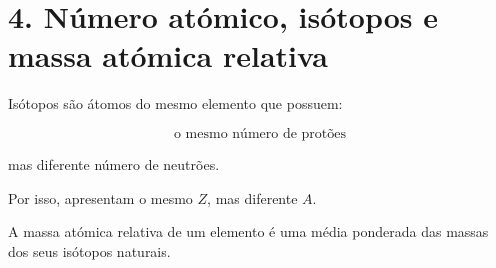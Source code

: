 \documentclass[11pt,a4paper]{article}
\begin{document}
	
	\section*{\textcolor{eublue}{4. Número atómico, isótopos e massa atómica relativa}}
	
	\begin{recorda}
		
		Isótopos são átomos do mesmo elemento que possuem:
		
		\[
		\boxed{
			\text{o mesmo número de protões}
		}
		\]
		
		mas diferente número de neutrões.
		
		Por isso, apresentam o mesmo \(Z\), mas diferente \(A\).
		
		A massa atómica relativa de um elemento é uma média ponderada das
		massas dos seus isótopos naturais.
		
	\end{recorda}
	
	
\end{document}
